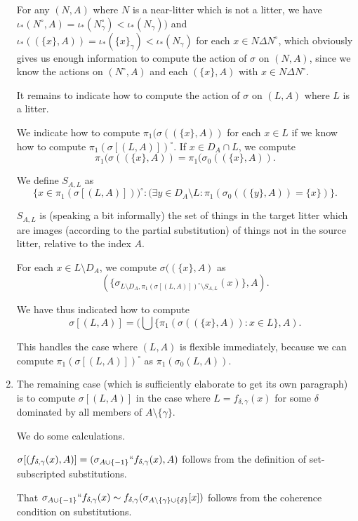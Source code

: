 \documentclass[12pt]{article}
\begin{document}
\begin{enumerate}
For any $(N,A)$ where $N$ is a near-litter which is not a litter, we have $\iota_*(N^\circ,A) = \iota_*(N^\circ_\gamma)<\iota_*(N_\gamma))$ and $\iota_*((\{x\},A)) = \iota_*(\{x\}_\gamma)<\iota_*(N_\gamma)$ for each $x \in N \Delta N^\circ$, which obviously gives us enough information to compute the action of $\sigma$ on $(N,A)$,
since we know the actions on $(N^\circ,A)$ and each $(\{x\},A)$ with $x \in N \Delta N^\circ$.

It remains to indicate how to compute the action of $\sigma$ on $(L,A)$ where $L$ is a litter.

We indicate how to compute $\pi_1(\sigma((\{x\},A))$ for each $x \in L$ if we know how to compute $\pi_1(\sigma[(L,A)])^\circ$.  If $x \in D_{A} \cap L$, we compute  $$\pi_1(\sigma((\{x\},A ))= \pi_1(\sigma_0((\{x\},A)).$$  


We define $S_{A,L}$ as $$\{x \in \pi_1(\sigma[(L,A)]))^\circ: (\exists y \in D_A \setminus L: \pi_1(\sigma_0((\{y\},A)) =\{x\})\}.$$

$S_{A,L}$ is (speaking a bit informally) the set of things in the target litter which are images (according to the partial substitution) of things not in the source litter, relative to the index $A$.


For each $x \in L \setminus D_{A}$, we compute $\sigma((\{x\},A)$ as $$(\{\sigma_{L \setminus D_{A},\pi_1(\sigma[(L,A)])^\circ \setminus S_{A,L}}(x)\},A).$$

We have thus indicated how to compute $$\sigma[(L,A)] = (\bigcup \{\pi_1(\sigma((\{x\},A)):x \in L\},A).$$

This handles the case where $(L,A)$ is flexible immediately, because we can compute $\pi_1(\sigma[(L,A)])^\circ$ as $\pi_1(\sigma_0(L,A))$.

\item The remaining case (which is sufficiently elaborate to get its own paragraph)  is to compute $\sigma[(L,A)]$ in the case where $L = f_{\delta,\gamma}(x)$ for some $\delta$ dominated by all members of $A \setminus \{\gamma\}$.

We do some calculations.  

$\sigma[( f_{\delta,\gamma}(x),A)] = (\sigma_{A\cup \{-1\}}`` f_{\delta,\gamma}(x),A)$ follows from the definition of set-subscripted substitutions.

That $\sigma_{A\cup \{-1\}}`` f_{\delta,\gamma}(x) \sim f_{\delta,\gamma}(\sigma_{A\setminus \{\gamma\}\cup \{\delta\}}[x])$ follows from the coherence condition on substitutions.


\end{enumerate}
\end{document}
